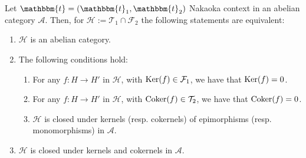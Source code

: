 \begin{nonlisting_thm}[\ref{thm_2_4}]
  Let $\mathbbm{t}=(\mathbbm{t}_1,\mathbbm{t}_2)$ Nakaoka context in an abelian category
  $\mathscr{A}$. Then, for
  $\mathcal{H}:=\mathcal{T}_1\cap\mathcal{F}_2$ the following statements are equivalent:
  \begin{enumerate}[label=(\alph*)]
    \item $\mathcal{H}$ is an abelian category.
    \item The following conditions hold:
      \begin{enumerate}[label=(\alph{enumi}\arabic*)]
        \item For any $f:H\to H'$ in $\mathcal{H}$, with $\operatorname{Ker}(f)\in\mathcal{F}_1$,
        we have that $\operatorname{Ker}(f)=0$.
        \item For any $f:H\to H'$ in $\mathcal{H}$, with $\operatorname{Coker}(f)\in\mathcal{T}_2$,
        we have that $\operatorname{Coker}(f)=0$.
        \item $\mathcal{H}$ is closed under kernels (resp. cokernels) of epimorphisms
        (resp. monomorphisms) in $\mathscr{A}$.
      \end{enumerate}
    \item $\mathcal{H}$ is closed under kernels and cokernels in $\mathscr{A}$.
  \end{enumerate}
\end{nonlisting_thm}




